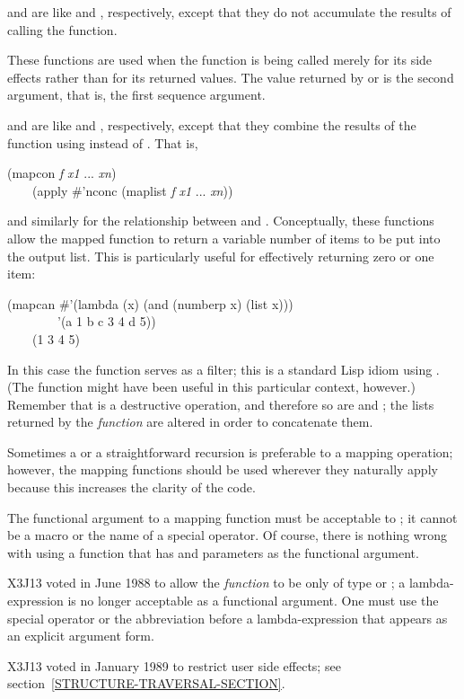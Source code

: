 \begin{defun}[Function]
 and  are like  and ,
respectively, except that they do not accumulate the results
of calling the function.

These functions are used when the function is being called merely for its
side effects rather than for its returned values.
The value returned by  or  is the second argument,
that is, the first sequence argument.

 and  are like  and , respectively,
except that they combine the results of
the function using  instead of .  That is,
\begin{lisp}
(mapcon \emph{f} \emph{x1} ... \emph{xn}) \\
~~~\EQ\ (apply \#'nconc (maplist \emph{f} \emph{x1} ... \emph{xn}))
\end{lisp}
and similarly for the relationship between  and .
Conceptually, these functions allow the mapped function to return
a variable number of items to be put into the output list.
This is particularly useful for effectively returning zero or one item:
\begin{lisp}
(mapcan \#'(lambda (x) (and (numberp x) (list x))) \\
~~~~~~~~'(a 1 b c 3 4 d 5)) \\
~~~\EV\ (1 3 4 5)
\end{lisp}
In this case the function serves as a filter; this is a standard Lisp
idiom using .
(The function  might have been useful in this
particular context, however.)
Remember that  is a destructive operation, and therefore
so are  and ; the lists returned by the \emph{function}
are altered in order to concatenate them.

Sometimes a  or a straightforward recursion is preferable to a
mapping operation;  however, the mapping functions should be used wherever they
naturally apply because this increases the clarity of the code.

The functional argument to a mapping function must be acceptable
to ; it cannot be a macro or the name of a special operator.
Of course, there is nothing wrong with using a function that has 
and  parameters as the functional argument.

\begin{newer}
X3J13 voted in June 1988  to allow the \emph{function}
to be only of type  or ; a lambda-expression
is no longer acceptable as a functional argument.  One must use the
 special operator or the abbreviation  before
a lambda-expression that appears as an  explicit argument form.
\end{newer}

\begin{new}
X3J13 voted in January 1989
to restrict user side effects; see section~\ref{STRUCTURE-TRAVERSAL-SECTION}.
\end{new}
\end{defun}

